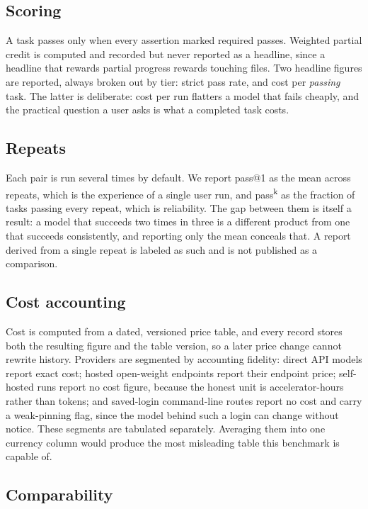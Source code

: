 \subsection{Scoring}

A task passes only when every assertion marked required passes. Weighted partial credit is computed and recorded but never reported as a headline, since a headline that rewards partial progress rewards touching files. Two headline figures are reported, always broken out by tier: strict pass rate, and cost per \emph{passing} task. The latter is deliberate: cost per run flatters a model that fails cheaply, and the practical question a user asks is what a completed task costs.

\subsection{Repeats}

Each pair is run several times by default. We report pass@1 as the mean across repeats, which is the experience of a single user run, and pass\textsuperscript{k} as the fraction of tasks passing every repeat, which is reliability. The gap between them is itself a result: a model that succeeds two times in three is a different product from one that succeeds consistently, and reporting only the mean conceals that. A report derived from a single repeat is labeled as such and is not published as a comparison.

\subsection{Cost accounting}

Cost is computed from a dated, versioned price table, and every record stores both the resulting figure and the table version, so a later price change cannot rewrite history. Providers are segmented by accounting fidelity: direct API models report exact cost; hosted open-weight endpoints report their endpoint price; self-hosted runs report no cost figure, because the honest unit is accelerator-hours rather than tokens; and saved-login command-line routes report no cost and carry a weak-pinning flag, since the model behind such a login can change without notice. These segments are tabulated separately. Averaging them into one currency column would produce the most misleading table this benchmark is capable of.

\subsection{Comparability}

